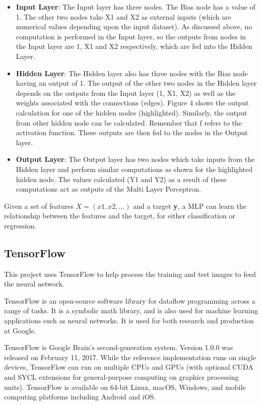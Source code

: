 \documentclass{article}
\begin{document}
\begin{itemize}
  \item \textbf{Input Layer}: The Input layer has three nodes. The Bias node has a value of 1. The other two nodes take X1 and X2 as external inputs (which are numerical values depending upon the input dataset). As discussed above, no computation is performed in the Input layer, so the outputs from nodes in the Input layer are 1, X1 and X2 respectively, which are fed into the Hidden Layer.

  \item \textbf{Hidden Layer}: The Hidden layer also has three nodes with the Bias node having an output of 1. The output of the other two nodes in the Hidden layer depends on the outputs from the Input layer (1, X1, X2) as well as the weights associated with the connections (edges). Figure 4 shows the output calculation for one of the hidden nodes (highlighted). Similarly, the output from other hidden node can be calculated. Remember that f refers to the activation function. These outputs are then fed to the nodes in the Output layer.
  \item \textbf{Output Layer}: The Output layer has two nodes which take inputs from the Hidden layer and perform similar computations as shown for the highlighted hidden node. The values calculated (Y1 and Y2) as a result of these computations act as outputs of the Multi Layer Perceptron.
\end{itemize}

Given a set of features $X = (x1, x2, …)$ and a target \textbf{y}, a MLP can learn the relationship between the features and the target, for either classification or regression.

\subsection{TensorFlow}

This project uses TensorFlow to help process the training and test images to feed the neural network.

TensorFlow is an open-source software library for dataflow programming across a range of tasks. It is a symbolic math library, and is also used for machine learning applications such as neural networks. It is used for both research and production at Google.

TensorFlow is Google Brain's second-generation system. Version 1.0.0 was released on February 11, 2017. While the reference implementation runs on single devices, TensorFlow can run on multiple CPUs and GPUs (with optional CUDA and SYCL extensions for general-purpose computing on graphics processing units). TensorFlow is available on 64-bit Linux, macOS, Windows, and mobile computing platforms including Android and iOS.
\end{document}
